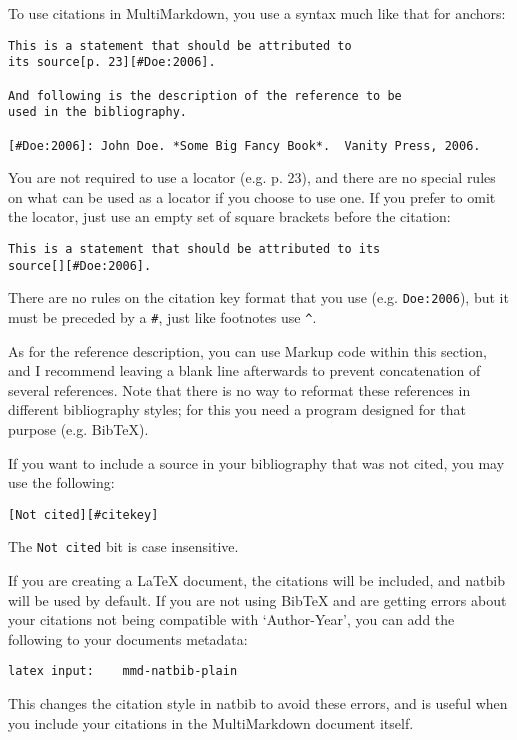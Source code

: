 To use citations in MultiMarkdown, you use a syntax much like that for anchors:

\begin{verbatim}
This is a statement that should be attributed to
its source[p. 23][#Doe:2006].

And following is the description of the reference to be
used in the bibliography.

[#Doe:2006]: John Doe. *Some Big Fancy Book*.  Vanity Press, 2006.
\end{verbatim}

You are not required to use a locator (e.g. p. 23), and there are no special rules on what can be used as a locator if you choose to use one. If you prefer to omit the locator, just use an empty set of square brackets before the citation:

\begin{verbatim}
This is a statement that should be attributed to its 
source[][#Doe:2006].
\end{verbatim}

There are no rules on the citation key format that you use (e.g. \texttt{Doe:2006}), but it must be preceded by a \texttt{\#}, just like footnotes use \texttt{\^{}}.

As for the reference description, you can use Markup code within this section, and I recommend leaving a blank line afterwards to prevent concatenation of several references. Note that there is no way to reformat these references in different bibliography styles; for this you need a program designed for that purpose (e.g. BibTeX).

If you want to include a source in your bibliography that was not cited, you may use the following:

\begin{verbatim}
[Not cited][#citekey]
\end{verbatim}

The \texttt{Not cited} bit is case insensitive.

If you are creating a LaTeX document, the citations will be included, and natbib will be used by default. If you are not using BibTeX and are getting errors about your citations not being compatible with `Author-Year', you can add the following to your documents metadata:

\begin{verbatim}
latex input:	mmd-natbib-plain
\end{verbatim}

This changes the citation style in natbib to avoid these errors, and is useful when you include your citations in the MultiMarkdown document itself.

